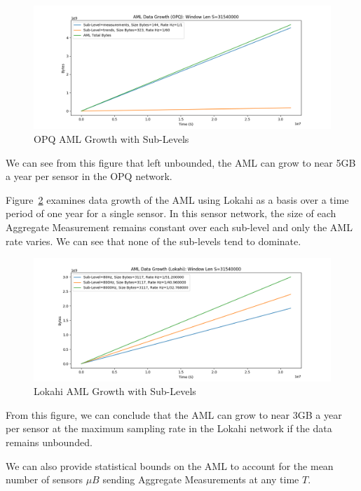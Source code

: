 \begin{figure}[H]
	\centering
	\includegraphics[width=\linewidth]{figures/plot_aml_level_opq_single.png}
	\caption{OPQ AML Growth with Sub-Levels}
	\label{fig:plot_aml_level_opq_single}
\end{figure}

We can see from this figure that left unbounded, the AML can grow to near 5GB a year per sensor in the OPQ network.

Figure~\ref{fig:plot_aml_level_lokahi_single} examines data growth of the AML using Lokahi as a basis over a time period of one year for a single sensor. In this sensor network, the size of each Aggregate Measurement remains constant over each sub-level and only the AML rate varies. We can see that none of the sub-levels tend to dominate.

\begin{figure}[H]
	\centering
	\includegraphics[width=\linewidth]{figures/plot_aml_level_lokahi_single.png}
	\caption{Lokahi AML Growth with Sub-Levels}
	\label{fig:plot_aml_level_lokahi_single}
\end{figure}

From this figure, we can conclude that the AML can grow to near 3GB a year per sensor at the maximum sampling rate in the Lokahi network if the data remains unbounded.

We can also provide statistical bounds on the AML to account for the mean number of sensors $\mu B$ sending Aggregate Measurements at any time $T$.

